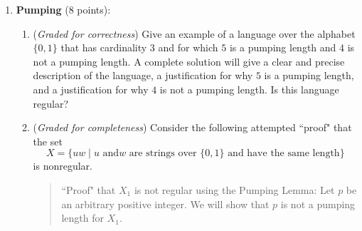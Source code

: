 \documentclass[12pt, oneside]{article}
\newcommand{\gradeCorrect}{({\it Graded for correctness}) }
\newcommand{\gradeComplete}{({\it Graded for completeness}) }
\begin{document}
\begin{enumerate}[wide, labelwidth=!, labelindent=0pt]
\begin{enumerate}
\item\gradeCorrect Illustrate this construction by defining a specific example NFA $N$ and applying the 
construction above to create a new NFA. Your example NFA should
\begin{itemize}
    \item Have exactly three states (all reachable from the start state),
    \item Have at least one spontaneous move (arrow labelled $\varepsilon$),
    \item Accept at least one string and reject at least one string, and
    \item Not have any states labelled $q_0$.
\end{itemize}
Apply the construction above to create the new NFA. A complete submission 
will include the state diagram of your example NFA $N$ and the state diagram of the NFA resulting 
from this construction.
\item\gradeCorrect Use Theorem 1.39 on page 55 of the book (see also page 7 in Week 3 notes) to construct a 
DFA equivalent to your example NFA $N$ from part (a).
A complete submission 
will include the state diagram of your example NFA $N$ and the state diagram of the DFA resulting 
from this construction, with the correct state labels for this DFA. You may prune the DFA so that only the ``macro-states''
reachable from the start state are included.
\item \gradeComplete Explain the relationship between $N_1$ and $N_2$ in the general construction.
Give an example string that is accepted by your example NFA $N$ and is rejected by the NFA that results from 
applying the general construction that illustrates this relationship, or explain why there is no such example string.

\end{enumerate}


\item \textbf{Pumping} (8 points):

\begin{enumerate}
\item\gradeCorrect Give an example of a language
over the alphabet $\{0,1\}$ that has cardinality $3$ and for which $5$ is a pumping length
and $4$ is not a pumping length.  A complete solution will give a clear and precise
description of the language, a justification for why $5$ is a pumping length, and a 
justification for why $4$ is not a pumping length. Is this language regular?
\item\gradeComplete Consider the following attempted ``proof" that the set 
$$X = \{ uw \mid \text{$u$ and
$w$ are strings over $\{0,1\}$ and have the same length} \}$$
is nonregular.
\begin{quote}
``Proof" that $X_1$ is not regular using the Pumping Lemma: Let $p$ be 
an arbitrary positive integer. We will show that $p$ is not a pumping length for $X_1$. 


\end{quote}
\end{enumerate}
\end{enumerate}
\end{document}
